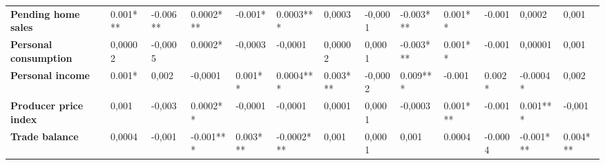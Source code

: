 \begin{landscape}
\begin{table}[]
{\begin{tabular}{@{}lllllllllllll@{}}
\textbf{Pending home sales}       & 0.001***                              & -0.006**                              & 0.0002***                             & -0.001*                               & 0.0003***                             & 0,0003                                & -0,0001                               & -0.003***                             & 0.001**                               & -0.001                                & 0,0002                                & 0,001                                 \\
\textbf{Personal consumption}     & 0,00002                               & -0,0005                               & 0.0002*                               & -0,0003                               & -0,0001                               & 0,00002                               & 0,0001                                & -0.003***                             & 0.001**                               & -0.001                                & 0,00001                               & 0,001                                 \\
\textbf{Personal income}          & 0.001*                                & 0,002                                 & -0,0001                               & 0.001**                               & 0.0004***                             & 0.003***                              & -0,0002                               & 0.009***                              & -0.001                                & 0.002*                                & -0.0004*                              & 0,002                                 \\
\textbf{Producer price index}     & 0,001                                 & -0,003                                & 0.0002**                              & -0,0001                               & -0,0001                               & 0,0001                                & 0,0001                                & -0,0003                               & 0.001***                              & -0.001                                & 0.001***                              & -0,001                                \\
\textbf{Trade balance}            & 0,0004                                & -0,001                                & -0.001***                             & 0.003***                              & -0.0002***                            & 0,001                                 & 0,0001                                & 0,001                                 & 0.0004                                & -0.0004                               & -0.001***                             & 0.004***                              \\ \bottomrule
\end{tabular}%
}


\end{table}
\end{landscape}
